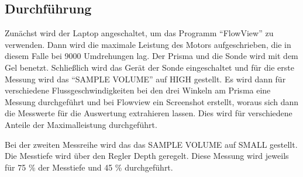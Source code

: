\subsection{Durchführung}
Zunächst wird der Laptop angeschaltet, um das Programm \enquote{FlowView} zu verwenden.
Dann wird die maximale Leistung des Motors aufgeschrieben, die in diesem Falle bei 9000 Umdrehungen lag.
Der Prisma und die Sonde wird mit dem Gel benetzt.
Schließlich wird das Gerät der Sonde eingeschaltet und für die erste Messung wird das \enquote{SAMPLE VOLUME} auf HIGH gestellt.
Es wird dann für verschiedene Flussgeschwindigkeiten bei den drei Winkeln am Prisma eine Messung durchgeführt
und bei Flowview ein Screenshot erstellt, woraus sich dann die Messwerte für die Auswertung extrahieren lassen.
Dies wird für verschiedene Anteile der Maximalleistung durchgeführt.

Bei der zweiten Messreihe wird das das SAMPLE VOLUME auf SMALL gestellt.
Die Messtiefe wird über den Regler Depth geregelt.
Diese Messung wird jeweils für 75 \% der Messtiefe und 45 \% durchgeführt.